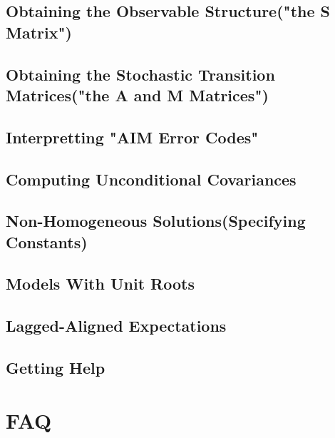 \documentclass[12pt]{article}
\begin{document}
\subsection{Obtaining the Observable Structure("the S Matrix")}

\subsection{Obtaining the Stochastic Transition Matrices("the A and M Matrices")}



\subsection{Interpretting "AIM Error Codes"}



\subsection{Computing Unconditional Covariances}
\label{sec:cov}

\subsection{Non-Homogeneous Solutions(Specifying Constants)}
\label{sec:constants}
\subsection{Models With Unit Roots}
\label{sec:constants}
\subsection{Lagged-Aligned Expectations}
\label{sec:lagged}



\subsection{Getting Help}
\label{sec:documentation}




\section{FAQ}
\label{sec:faq}



\end{document}

